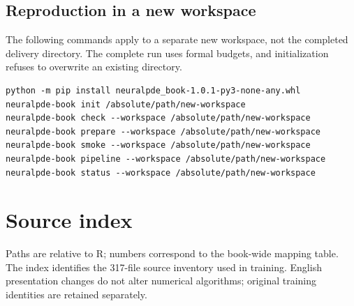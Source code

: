 \documentclass[a4paper,10pt]{article}
\begin{document}
\subsection{Reproduction in a new workspace}

The following commands apply to a separate new workspace, not the completed delivery directory. The complete run uses formal budgets, and initialization refuses to overwrite an existing directory.

\begin{Verbatim}[fontsize=\footnotesize,frame=single]
python -m pip install neuralpde_book-1.0.1-py3-none-any.whl
neuralpde-book init /absolute/path/new-workspace
neuralpde-book check --workspace /absolute/path/new-workspace
neuralpde-book prepare --workspace /absolute/path/new-workspace
neuralpde-book smoke --workspace /absolute/path/new-workspace
neuralpde-book pipeline --workspace /absolute/path/new-workspace
neuralpde-book status --workspace /absolute/path/new-workspace
\end{Verbatim}

\section{Source index}

Paths are relative to R; numbers correspond to the book-wide mapping table. The index identifies the 317-file source inventory used in training. English presentation changes do not alter numerical algorithms; original training identities are retained separately.
\end{document}
